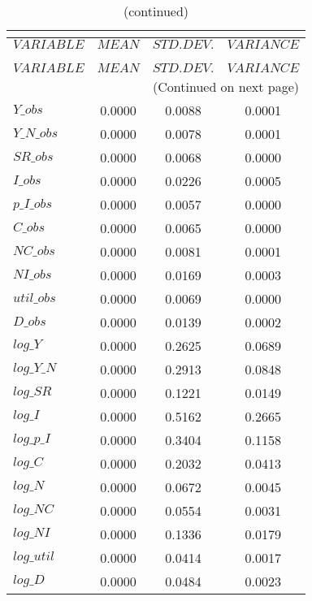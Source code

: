  
\begin{center}
\begin{longtable}{lccc} 
\caption{THEORETICAL MOMENTS}\\
 \label{Table:th_moments}\\
\toprule 
$VARIABLE   $	 & 	 $         MEAN$	 & 	 $    STD. DEV.$	 & 	 $     VARIANCE$\\
\midrule \endfirsthead 
\caption{(continued)}\\
 \toprule \\ 
$VARIABLE   $	 & 	 $         MEAN$	 & 	 $    STD. DEV.$	 & 	 $     VARIANCE$\\
\midrule \endhead 
\midrule \multicolumn{4}{r}{(Continued on next page)} \\ \bottomrule \endfoot 
\bottomrule \endlastfoot 
$Y\_obs     $	 & 	       0.0000	 & 	       0.0088	 & 	       0.0001 \\ 
$Y\_N\_obs  $	 & 	       0.0000	 & 	       0.0078	 & 	       0.0001 \\ 
$SR\_obs    $	 & 	       0.0000	 & 	       0.0068	 & 	       0.0000 \\ 
$I\_obs     $	 & 	       0.0000	 & 	       0.0226	 & 	       0.0005 \\ 
$p\_I\_obs  $	 & 	       0.0000	 & 	       0.0057	 & 	       0.0000 \\ 
$C\_obs     $	 & 	       0.0000	 & 	       0.0065	 & 	       0.0000 \\ 
$NC\_obs    $	 & 	       0.0000	 & 	       0.0081	 & 	       0.0001 \\ 
$NI\_obs    $	 & 	       0.0000	 & 	       0.0169	 & 	       0.0003 \\ 
$util\_obs  $	 & 	       0.0000	 & 	       0.0069	 & 	       0.0000 \\ 
$D\_obs     $	 & 	       0.0000	 & 	       0.0139	 & 	       0.0002 \\ 
$log\_Y     $	 & 	       0.0000	 & 	       0.2625	 & 	       0.0689 \\ 
$log\_Y\_N  $	 & 	       0.0000	 & 	       0.2913	 & 	       0.0848 \\ 
$log\_SR    $	 & 	       0.0000	 & 	       0.1221	 & 	       0.0149 \\ 
$log\_I     $	 & 	       0.0000	 & 	       0.5162	 & 	       0.2665 \\ 
$log\_p\_I  $	 & 	       0.0000	 & 	       0.3404	 & 	       0.1158 \\ 
$log\_C     $	 & 	       0.0000	 & 	       0.2032	 & 	       0.0413 \\ 
$log\_N     $	 & 	       0.0000	 & 	       0.0672	 & 	       0.0045 \\ 
$log\_NC    $	 & 	       0.0000	 & 	       0.0554	 & 	       0.0031 \\ 
$log\_NI    $	 & 	       0.0000	 & 	       0.1336	 & 	       0.0179 \\ 
$log\_util  $	 & 	       0.0000	 & 	       0.0414	 & 	       0.0017 \\ 
$log\_D     $	 & 	       0.0000	 & 	       0.0484	 & 	       0.0023 \\ 
\end{longtable}
 \end{center}
